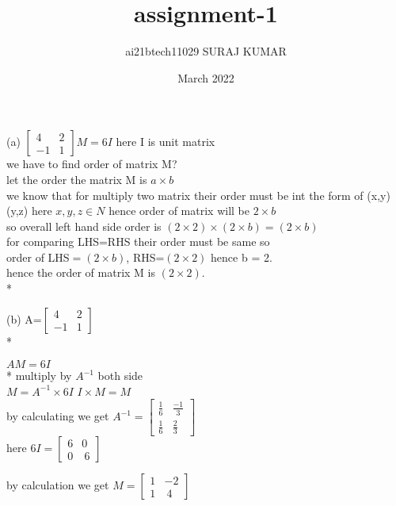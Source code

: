 \documentclass[12pt]{article}
\title{assignment-1}
\author{ai21btech11029 \hspace{5mm}SURAJ KUMAR }
\date{March 2022}
\begin{document}
\maketitle

    (a) $\begin{bmatrix}
     4 & 2 \\
     -1 & 1 
      \end{bmatrix}M=6I$ \hspace{2cm}  here I is unit matrix\\
      we have to find order of matrix M?\\
      let the order the matrix M is\hspace{5mm}  $a\times b$\\
      
      we know that for multiply two matrix their order must be int the form of  (x,y) (y,z) here $x,y,z \in N$
      hence order of matrix will be $2\times b$\\
      so overall left hand side order is  $(2\times 2)\times(2\times b) =(2\times b)$\\
      for comparing LHS=RHS their order must be same so \\
      order of LHS$=(2\times b)$,
      RHS=$(2\times 2)$  hence b = 2.\\
      hence the order of matrix M is $(2\times 2).$\\*
      \vspace{5mm}
      
      
     \hspace{5mm}(b) A=$\begin{bmatrix}
      4 & 2\\
    -1 & 1
     \end{bmatrix}$\\*

 \centering \Large $AM=6I$\\*
 multiply by $A^{-1}$ both side\\\vspace{5mm}
 $M=A^{-1}\times 6I$ \hspace {2cm}  $ I\times M=M$\\\vspace{5mm}
 by calculating we get \centering  $A^{-1}=\begin{bmatrix}
      \frac{1}{6} & \frac{-1}{3}\\
    \frac{1}{6} & \frac{2}{3}
     \end{bmatrix}$\\\vspace{5mm}
\centering here $6I=\begin{bmatrix}
       6&0 \\
    0 & \ 6
     \end{bmatrix}$\\\vspace{5mm}
\raggedright by calculation we get $M=\begin{bmatrix}
       1&-2 \\
    1 & \ 4
     \end{bmatrix}$\\
     
      
      
\end{document}
